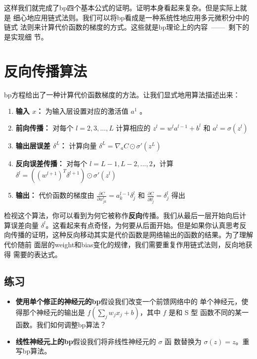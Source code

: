 这样我们就完成了\gls*{bp}四个基本公式的证明。证明本身看起来复杂。但是实际上就是
细心地应用链式法则。我们可以将\gls*{bp}看成是一种系统性地应用多元微积分中的链式
法则来计算代价函数的梯度的方式。这些就是\gls*{bp}理论上的内容~——~剩下的是实现细
节。

\section{反向传播算法}
\label{sec:the_backpropagation_algorithm}

\gls*{bp}方程给出了一种计算代价函数梯度的方法。让我们显式地用算法描述出来：

\begin{enumerate}
\item \textbf{输入 $x$：} 为输入层设置对应的激活值 $a^{1}$ 。
\item \textbf{前向传播：} 对每个 $l=2,3,...,L$ 计算相应的 $z^l = w^la^{l-1} +
  b^l$ 和 $a^l = \sigma(z^l)$
\item \textbf{输出层误差 $\delta^L$：} 计算向量 $\delta^L = \nabla_a C \odot
  \sigma'(z^L)$
\item \textbf{反向误差传播：} 对每个 $l=L-1, L-2,...,2$，计算
  $\delta^l = ((w^{l+1})^T\delta^{l+1})\odot \sigma'(z^l)$
\item \textbf{输出：} 代价函数的梯度由 $\frac{\partial C}{\partial w^l_{jk}} =
  a^{l-1}_k \delta^l_j$ 和 $\frac{\partial C}{\partial b_j^l} = \delta_j^l$ 得出
\end{enumerate}

检视这个算法，你可以看到为何它被称作\textbf{反向}传播。我们从最后一层开始向后计
算误差向量 $\delta^l$。这看起来有点奇怪，为何要从后面开始。但是如果你认真思考反
向传播的证明，这种反向移动其实是代价函数是网络输出的函数的结果。为了理解代价随前
面层的\gls*{weight}和\gls*{bias}变化的规律，我们需要重复作用链式法则，反向地获得
需要的表达式。

\subsection*{练习}

\begin{itemize}
\item \textbf{使用单个修正的神经元的\gls*{bp}}\quad 假设我们改变一个前馈网络中的
  单个神经元，使得那个神经元的输出是 $f(\sum_j w_jx_j + b)$，其中 $f$ 是和 S 型
  函数不同的某一函数。我们如何调整\gls*{bp}算法？
\item \textbf{线性神经元上的\gls*{bp}}\quad 假设我们将非线性神经元的 $\sigma$ 函
  数替换为 $\sigma(z) = z$。重写\gls*{bp}算法。
\end{itemize}

